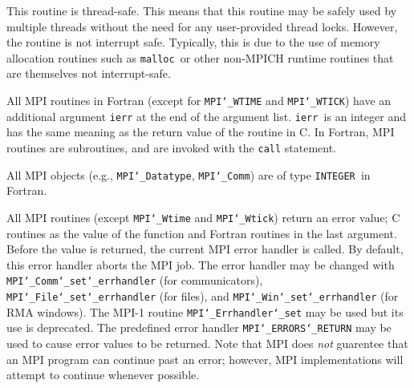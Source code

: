 \par
{}
\par
This routine is thread-safe.  This means that this routine may be
safely used by multiple threads without the need for any user-provided
thread locks.  However, the routine is not interrupt safe.  Typically,
this is due to the use of memory allocation routines such as {\tt malloc
}or other non-MPICH runtime routines that are themselves not interrupt-safe.
\par
{}
All MPI routines in Fortran (except for {\tt MPI{\tt \char`\_}WTIME} and {\tt MPI{\tt \char`\_}WTICK}) have
an additional argument {\tt ierr} at the end of the argument list.  {\tt ierr
}is an integer and has the same meaning as the return value of the routine
in C.  In Fortran, MPI routines are subroutines, and are invoked with the
{\tt call} statement.
\par
All MPI objects (e.g., {\tt MPI{\tt \char`\_}Datatype}, {\tt MPI{\tt \char`\_}Comm}) are of type {\tt INTEGER
}in Fortran.
\par
{}
\par
All MPI routines (except {\tt MPI{\tt \char`\_}Wtime} and {\tt MPI{\tt \char`\_}Wtick}) return an error value;
C routines as the value of the function and Fortran routines in the last
argument.  Before the value is returned, the current MPI error handler is
called.  By default, this error handler aborts the MPI job.  The error handler
may be changed with {\tt MPI{\tt \char`\_}Comm{\tt \char`\_}set{\tt \char`\_}errhandler} (for communicators),
{\tt MPI{\tt \char`\_}File{\tt \char`\_}set{\tt \char`\_}errhandler} (for files), and {\tt MPI{\tt \char`\_}Win{\tt \char`\_}set{\tt \char`\_}errhandler} (for
RMA windows).  The MPI-1 routine {\tt MPI{\tt \char`\_}Errhandler{\tt \char`\_}set} may be used but
its use is deprecated.  The predefined error handler
{\tt MPI{\tt \char`\_}ERRORS{\tt \char`\_}RETURN} may be used to cause error values to be returned.
Note that MPI does {\em not} guarentee that an MPI program can continue past
an error; however, MPI implementations will attempt to continue whenever
possible.
\par
{}
\endmanpage

